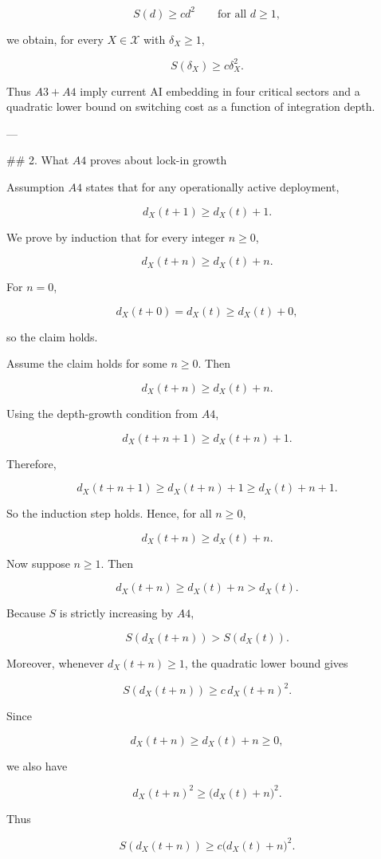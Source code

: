 \[
S(d)\ge c d^2
\qquad\text{for all }d\ge 1,
\]

we obtain, for every \(X\in\mathcal X\) with \(\delta_X\ge 1\),

\[
S(\delta_X)\ge c\delta_X^2.
\]

Thus \(A3+A4\) imply current AI embedding in four critical sectors and a quadratic lower bound on switching cost as a function of integration depth.

---

## 2. What \(A4\) proves about lock-in growth

Assumption \(A4\) states that for any operationally active deployment,

\[
d_X(t+1)\ge d_X(t)+1.
\]

We prove by induction that for every integer \(n\ge 0\),

\[
d_X(t+n)\ge d_X(t)+n.
\]

For \(n=0\),

\[
d_X(t+0)=d_X(t)\ge d_X(t)+0,
\]

so the claim holds.

Assume the claim holds for some \(n\ge 0\). Then

\[
d_X(t+n)\ge d_X(t)+n.
\]

Using the depth-growth condition from \(A4\),

\[
d_X(t+n+1)\ge d_X(t+n)+1.
\]

Therefore,

\[
d_X(t+n+1)
\ge d_X(t+n)+1
\ge d_X(t)+n+1.
\]

So the induction step holds. Hence, for all \(n\ge 0\),

\[
d_X(t+n)\ge d_X(t)+n.
\]

Now suppose \(n\ge 1\). Then

\[
d_X(t+n)\ge d_X(t)+n>d_X(t).
\]

Because \(S\) is strictly increasing by \(A4\),

\[
S(d_X(t+n))>S(d_X(t)).
\]

Moreover, whenever \(d_X(t+n)\ge 1\), the quadratic lower bound gives

\[
S(d_X(t+n))\ge c\,d_X(t+n)^2.
\]

Since

\[
d_X(t+n)\ge d_X(t)+n\ge 0,
\]

we also have

\[
d_X(t+n)^2\ge \bigl(d_X(t)+n\bigr)^2.
\]

Thus

\[
S(d_X(t+n))
\ge c\bigl(d_X(t)+n\bigr)^2.
\]

